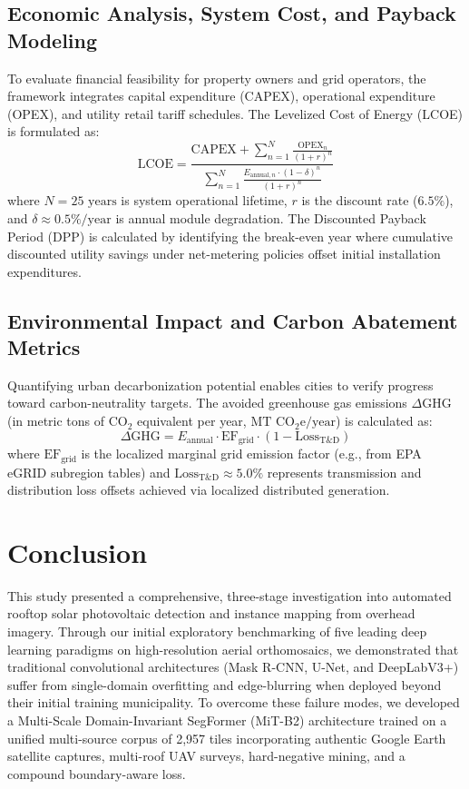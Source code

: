 \documentclass[conference]{IEEEtran}
\begin{document}
\subsection{Economic Analysis, System Cost, and Payback Modeling}
To evaluate financial feasibility for property owners and grid operators, the framework integrates capital expenditure (CAPEX), operational expenditure (OPEX), and utility retail tariff schedules. The Levelized Cost of Energy (LCOE) is formulated as:
\begin{equation}
\text{LCOE} = \frac{\text{CAPEX} + \sum_{n=1}^N \frac{\text{OPEX}_n}{(1 + r)^n}}{\sum_{n=1}^N \frac{E_{\text{annual}, n} \cdot (1 - \delta)^n}{(1 + r)^n}}
\end{equation}
where $N = 25\text{ years}$ is system operational lifetime, $r$ is the discount rate ($6.5\%$), and $\delta \approx 0.5\%/\text{year}$ is annual module degradation. The Discounted Payback Period (DPP) is calculated by identifying the break-even year where cumulative discounted utility savings under net-metering policies offset initial installation expenditures.

\subsection{Environmental Impact and Carbon Abatement Metrics}
Quantifying urban decarbonization potential enables cities to verify progress toward carbon-neutrality targets. The avoided greenhouse gas emissions $\Delta\text{GHG}$ (in metric tons of $\text{CO}_2$ equivalent per year, $\text{MT CO}_2\text{e/year}$) is calculated as:
\begin{equation}
\Delta\text{GHG} = E_{\text{annual}} \cdot \text{EF}_{\text{grid}} \cdot (1 - \text{Loss}_{\text{T\&D}})
\end{equation}
where $\text{EF}_{\text{grid}}$ is the localized marginal grid emission factor (e.g., from EPA eGRID subregion tables) and $\text{Loss}_{\text{T\&D}} \approx 5.0\%$ represents transmission and distribution loss offsets achieved via localized distributed generation.

\section{Conclusion}
This study presented a comprehensive, three-stage investigation into automated rooftop solar photovoltaic detection and instance mapping from overhead imagery. Through our initial exploratory benchmarking of five leading deep learning paradigms on high-resolution aerial orthomosaics, we demonstrated that traditional convolutional architectures (Mask R-CNN, U-Net, and DeepLabV3+) suffer from single-domain overfitting and edge-blurring when deployed beyond their initial training municipality. To overcome these failure modes, we developed a Multi-Scale Domain-Invariant SegFormer (MiT-B2) architecture trained on a unified multi-source corpus of 2,957 tiles incorporating authentic Google Earth satellite captures, multi-roof UAV surveys, hard-negative mining, and a compound boundary-aware loss.
\end{document}
